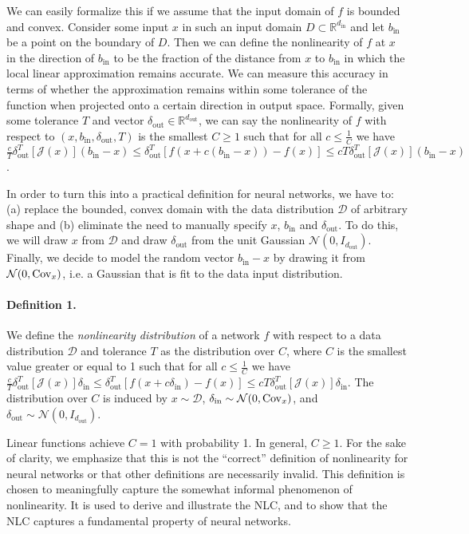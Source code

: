 \documentclass{article} %
\begin{document}
We can easily formalize this if we assume that the input domain of $f$ is bounded and convex. Consider some input $x$ in such an input domain $D \subset \mathbb{R}^{d_\text{in}}$ and let $b_\text{in}$ be a point on the boundary of $D$. Then we can define the nonlinearity of $f$ at $x$ in the direction of $b_\text{in}$ to be the fraction of the distance from $x$ to $b_\text{in}$ in which the local linear approximation remains accurate. We can measure this accuracy in terms of whether the approximation remains within some tolerance of the function when projected onto a certain direction in output space. Formally, given some tolerance $T$ and vector $\delta_\text{out} \in \mathbb{R}^{d_\text{out}}$, we can say the nonlinearity of $f$ with respect to $(x,b_\text{in},\delta_\text{out},T)$ is the smallest $C \ge 1$ such that for all $c \le \frac{1}{C}$ we have $\frac{c}{T}\delta_\text{out}^T[\mathcal{J}(x)](b_\text{in} - x) \le \delta_\text{out}^T[f(x + c(b_\text{in} - x)) - f(x)] \le cT\delta_\text{out}^T[\mathcal{J}(x)](b_\text{in} - x)$.

In order to turn this into a practical definition for neural networks, we have to: (a) replace the bounded, convex domain with the data distribution $\mathcal{D}$ of arbitrary shape and (b) eliminate the need to manually specify $x$, $b_\text{in}$ and $\delta_\text{out}$. To do this, we will draw $x$ from $\mathcal{D}$ and draw $\delta_\text{out}$ from the unit Gaussian $\mathcal{N}(0,I_{d_\text{out}})$. Finally, we decide to model the random vector $b_\text{in} - x$ by drawing it from $\mathcal{N}(0, \mathrm{Cov}_x)$, i.e. a Gaussian that is fit to the data input distribution.

\paragraph{Definition 1.} We define the {\it nonlinearity distribution} of a network $f$ with respect to a data distribution $\mathcal{D}$ and tolerance $T$ as the distribution over $C$, where $C$ is the smallest value greater or equal to 1 such that for all $c \le \frac{1}{C}$ we have $\frac{c}{T}\delta_\text{out}^T[\mathcal{J}(x)]\delta_\text{in} \le \delta_\text{out}^T[f(x + c\delta_\text{in}) - f(x)] \le cT\delta_\text{out}^T[\mathcal{J}(x)]\delta_\text{in}$. The distribution over $C$ is induced by $x \sim \mathcal{D}$, $\delta_\text{in} \sim \mathcal{N}(0, \mathrm{Cov}_x)$,  and $\delta_\text{out} \sim \mathcal{N}(0, I_{d_\text{out}})$.

Linear functions achieve $C=1$ with probability 1. In general, $C \ge 1$. For the sake of clarity, we emphasize that this is not the ``correct'' definition of nonlinearity for neural networks or that other definitions are necessarily invalid. This definition is chosen to meaningfully capture the somewhat informal phenomenon of nonlinearity. It is used to derive and illustrate the NLC, and to show that the NLC captures a fundamental property of neural networks. %
\end{document}

